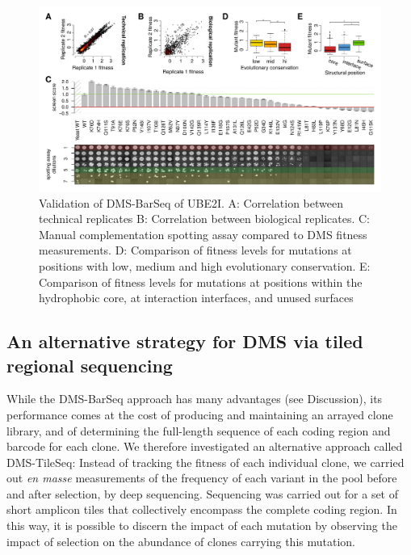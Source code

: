 
\begin{landscape}
\begin{figure}
	\centering
	\includegraphics[width=9in]{img/barseq-validation.pdf}
	\caption{Validation of DMS-BarSeq of UBE2I. A: Correlation between technical replicates B: Correlation between biological replicates. C: Manual complementation spotting assay compared to DMS fitness measurements. D: Comparison of fitness levels for mutations at positions with low, medium and high evolutionary conservation. E: Comparison of fitness levels for mutations at positions within the hydrophobic core, at interaction interfaces, and unused surfaces}
	\label{fig:barseqValidation}
\end{figure}
\end{landscape}


\subsection{An alternative strategy for DMS via tiled regional sequencing}

While the DMS-BarSeq approach has many advantages (see Discussion), its performance comes at the cost of producing and maintaining an arrayed clone library, and of determining the full-length sequence of each coding region and barcode for each clone. We therefore investigated an alternative approach called DMS-TileSeq: Instead of tracking the fitness of each individual clone, we carried out \textit{en masse} measurements of the frequency of each variant in the pool before and after selection, by deep sequencing.  Sequencing was carried out for a set of short amplicon tiles that collectively encompass the complete coding region.  In this way, it is possible to discern the impact of each mutation by observing the impact of selection on the abundance of clones carrying this mutation.

